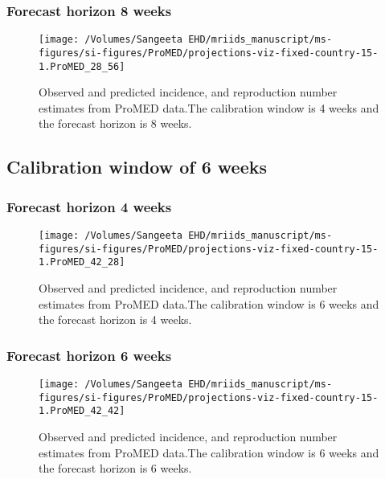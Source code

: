 \documentclass[11pt,]{article}
\begin{document}
\hypertarget{forecast-horizon-8-weeks-1}{%
  \subsubsection{Forecast horizon 8
    weeks}\label{forecast-horizon-8-weeks-1}}

\begin{figure}

  {
    \centering \texttt{[image: /Volumes/Sangeeta EHD/mriids\_manuscript/ms-figures/si-figures/ProMED/projections-viz-fixed-country-15-1.ProMED\_28\_56]} 

  }

  \caption{Observed and predicted incidence, and reproduction number
    estimates from ProMED data.The calibration window is 4 weeks and
    the forecast horizon is 8 weeks.}
  \label{fig:pm48}
\end{figure}

\hypertarget{calibration-window-of-6-weeks}{%
  \subsection{Calibration window of 6 weeks}\label{calibration-window-of-6-weeks}}

\hypertarget{forecast-horizon-4-weeks-1}{%
  \subsubsection{Forecast horizon 4 weeks}\label{forecast-horizon-4-weeks-1}}

\begin{figure}

  {
    \centering \texttt{[image: /Volumes/Sangeeta EHD/mriids\_manuscript/ms-figures/si-figures/ProMED/projections-viz-fixed-country-15-1.ProMED\_42\_28]} 

  }

  \caption{Observed and predicted incidence, and reproduction number
    estimates from ProMED data.The calibration window is 6 weeks and
    the forecast horizon is 4 weeks.}
  \label{fig:pm64}
\end{figure}

\hypertarget{forecast-horizon-6-weeks-2}{%
  \subsubsection{Forecast horizon 6 weeks}\label{forecast-horizon-6-weeks-2}}

\begin{figure}

  {
    \centering \texttt{[image: /Volumes/Sangeeta EHD/mriids\_manuscript/ms-figures/si-figures/ProMED/projections-viz-fixed-country-15-1.ProMED\_42\_42]} 
  }
  \caption{Observed and predicted incidence, and
    reproduction number estimates from ProMED data.The calibration
    window is 6 weeks and the forecast horizon is 6 weeks.}
  \label{fig:pm66}
\end{figure}
\end{document}
